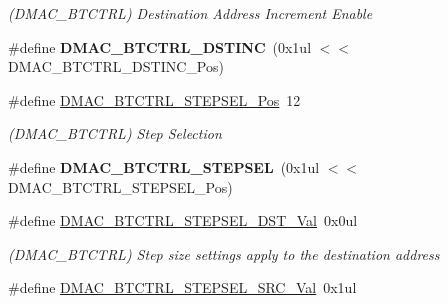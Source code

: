 \begin{DoxyCompactItemize}
\begin{DoxyCompactList}\small\item\em (D\+M\+A\+C\+\_\+\+B\+T\+C\+T\+R\+L) Destination Address Increment Enable \end{DoxyCompactList}\item 
\hypertarget{group___s_a_m_l21___d_m_a_c_gab2dd949ec7190e41ab1712889f72ba6d}{}\#define {\bfseries D\+M\+A\+C\+\_\+\+B\+T\+C\+T\+R\+L\+\_\+\+D\+S\+T\+I\+N\+C}~(0x1ul $<$$<$ D\+M\+A\+C\+\_\+\+B\+T\+C\+T\+R\+L\+\_\+\+D\+S\+T\+I\+N\+C\+\_\+\+Pos)\label{group___s_a_m_l21___d_m_a_c_gab2dd949ec7190e41ab1712889f72ba6d}

\item 
\hypertarget{group___s_a_m_l21___d_m_a_c_ga2ccb7639cc6f4d7e9446f5eb9ef92bb3}{}\#define \hyperlink{group___s_a_m_l21___d_m_a_c_ga2ccb7639cc6f4d7e9446f5eb9ef92bb3}{D\+M\+A\+C\+\_\+\+B\+T\+C\+T\+R\+L\+\_\+\+S\+T\+E\+P\+S\+E\+L\+\_\+\+Pos}~12\label{group___s_a_m_l21___d_m_a_c_ga2ccb7639cc6f4d7e9446f5eb9ef92bb3}

\begin{DoxyCompactList}\small\item\em (D\+M\+A\+C\+\_\+\+B\+T\+C\+T\+R\+L) Step Selection \end{DoxyCompactList}\item 
\hypertarget{group___s_a_m_l21___d_m_a_c_gafc0ee57febfb80afb2b1d80524855399}{}\#define {\bfseries D\+M\+A\+C\+\_\+\+B\+T\+C\+T\+R\+L\+\_\+\+S\+T\+E\+P\+S\+E\+L}~(0x1ul $<$$<$ D\+M\+A\+C\+\_\+\+B\+T\+C\+T\+R\+L\+\_\+\+S\+T\+E\+P\+S\+E\+L\+\_\+\+Pos)\label{group___s_a_m_l21___d_m_a_c_gafc0ee57febfb80afb2b1d80524855399}

\item 
\hypertarget{group___s_a_m_l21___d_m_a_c_gaa8bca72306ade35c2c8c0b06b1afe80d}{}\#define \hyperlink{group___s_a_m_l21___d_m_a_c_gaa8bca72306ade35c2c8c0b06b1afe80d}{D\+M\+A\+C\+\_\+\+B\+T\+C\+T\+R\+L\+\_\+\+S\+T\+E\+P\+S\+E\+L\+\_\+\+D\+S\+T\+\_\+\+Val}~0x0ul\label{group___s_a_m_l21___d_m_a_c_gaa8bca72306ade35c2c8c0b06b1afe80d}

\begin{DoxyCompactList}\small\item\em (D\+M\+A\+C\+\_\+\+B\+T\+C\+T\+R\+L) Step size settings apply to the destination address \end{DoxyCompactList}\item 
\hypertarget{group___s_a_m_l21___d_m_a_c_ga4bbc579e64b22419578173c2d2d42bc0}{}\#define \hyperlink{group___s_a_m_l21___d_m_a_c_ga4bbc579e64b22419578173c2d2d42bc0}{D\+M\+A\+C\+\_\+\+B\+T\+C\+T\+R\+L\+\_\+\+S\+T\+E\+P\+S\+E\+L\+\_\+\+S\+R\+C\+\_\+\+Val}~0x1ul\label{group___s_a_m_l21___d_m_a_c_ga4bbc579e64b22419578173c2d2d42bc0}


\end{DoxyCompactItemize}
